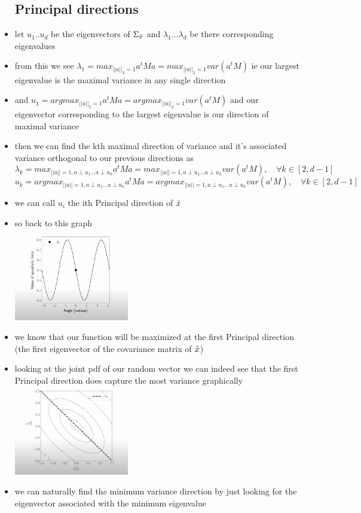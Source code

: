 \documentclass{article}
\begin{document}
\begin{itemize}
\subsection*{Principal directions}
\item let $u_1..u_d$ be the eigenvectors of $\Sigma_{\Tilde{x}}$ and $\lambda_1...\lambda_d$ be there corresponding eigenvalues
\item from this we see $\lambda_1=max_{||a||_{2}=1}a^tMa=max_{||a||_{2}=1}var(a^tM)$ ie our largest eigenvalue is the maximal variance in any single direction
\item and $u_1=argmax_{||a||_{2}=1}a^tMa=argmax_{||a||_{2}=1}var(a^tM)$ and our eigenvector corresponding to the largest eigenvalue is our direction of maximal variance
\item  then we can find the kth maximal direction of variance and it's associated variance orthogonal to our previous directions as $$\lambda_{k}=max_{||a||=1, a\perp u_1 \dots a\perp u_k}a^tMa=max_{||a||=1, a\perp u_1 \dots a\perp u_k}var(a^tM), \quad \forall k \in [2,d-1]$$
$$u_{k}=argmax_{||a||=1, a\perp u_1 \dots a\perp u_k}a^tMa=argmax_{||a||=1, a\perp u_1 \dots a\perp u_k}var(a^tM), \quad \forall k \in [2,d-1]$$
\item we can call $u_{i}$ the ith Principal direction of $\Tilde{x}$
\item so back to this graph \\ \includegraphics[width=5cm]{notes/week_8/vedio_2/immages/v2_2.png}
\item we know that our function will be maximized at the first Principal direction (the first eigenvector of the covariance matrix of $\Tilde{x}$)
\item looking at the joint pdf of our random vector we can indeed see that the first Principal direction does capture the most variance graphically \\ \includegraphics[width=5cm]{notes/week_8/vedio_2/immages/v2_3.png}
\item we can naturally find the minimum variance direction by just looking for the eigenvector associated with the minimum eigenvalue

\end{itemize}
\end{document}
